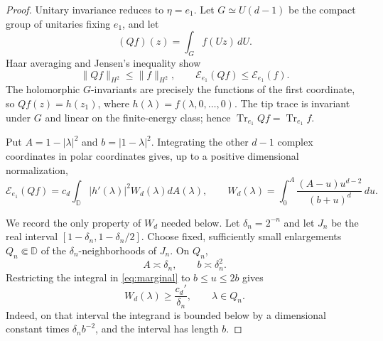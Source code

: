 \documentclass[11pt]{article}
\theoremstyle{remark}
\newcommand{\Tr}{\operatorname{Tr}}
\begin{document}
\begin{proof}
Unitary invariance reduces to $\eta=e_1$.  Let $G\simeq U(d-1)$ be the
compact group of unitaries fixing $e_1$, and let
\[
 (Qf)(z)=\int_G f(Uz)\,dU.
\]
Haar averaging and Jensen's inequality show
\begin{equation}\label{eq:contractions}
 \lVert Qf\rVert_{H^2}\leq\lVert f\rVert_{H^2},
 \qquad \mathcal E_{e_1}(Qf)\leq\mathcal E_{e_1}(f).
\end{equation}
The holomorphic $G$-invariants are precisely the functions of the first
coordinate, so $Qf(z)=h(z_1)$, where $h(\lambda)=f(\lambda,0,\ldots,0)$.
The tip trace is invariant under $G$ and linear on the finite-energy class;
hence $\Tr_{e_1}Qf=\Tr_{e_1}f$.

Put $A=1-|\lambda|^2$ and $b=|1-\lambda|^2$.  Integrating the other
$d-1$ complex coordinates in polar coordinates gives, up to a positive
dimensional normalization,
\begin{equation}\label{eq:marginal}
 \mathcal E_{e_1}(Qf)
 =c_d\int_{\mathbb D}|h'(\lambda)|^2W_d(\lambda)dA(\lambda),
 \qquad
 W_d(\lambda)=\int_0^A
 \frac{(A-u)u^{d-2}}{(b+u)^d}\,du.
\end{equation}

We record the only property of $W_d$ needed below.  Let
$\delta_n=2^{-n}$ and let $J_n$ be the real interval
$[1-\delta_n,1-\delta_n/2]$.  Choose fixed, sufficiently small enlargements
$Q_n\Subset\mathbb D$ of the $\delta_n$-neighborhoods of $J_n$.  On $Q_n$,
\begin{equation}\label{eq:comparabilities}
 A\asymp\delta_n,\qquad b\asymp\delta_n^2.
\end{equation}
Restricting the integral in \eqref{eq:marginal} to $b\leq u\leq2b$ gives
\begin{equation}\label{eq:Wlower}
 W_d(\lambda)\geq\frac{c_d'}{\delta_n},
 \qquad \lambda\in Q_n.
\end{equation}
Indeed, on that interval the integrand is bounded below by a dimensional
constant times $\delta_n b^{-2}$, and the interval has length $b$.


\end{proof}
\end{document}
